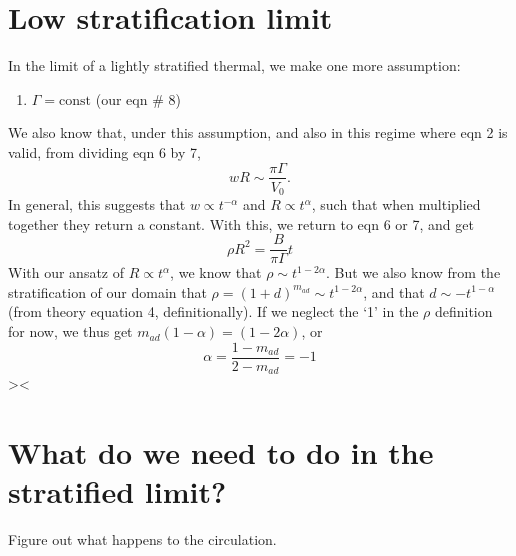 \documentclass[onecolumn, amsmath, amsfonts, amssymb]{aastex62}
\begin{document}
\section{Low stratification limit}
In the limit of a lightly stratified thermal, we make one more assumption:
\begin{enumerate}
\item $\Gamma = \text{const}$ (our eqn \# 8)
\end{enumerate}
We also know that, under this assumption, and also in this regime where eqn 2 is valid,
from dividing eqn 6 by 7, 
$$
w R \sim \frac{\pi\Gamma}{V_0}.
$$
In general, this suggests that $w \propto t^{-\alpha}$ and $R \propto t^{\alpha}$, such that
when multiplied together they return a constant. With this, we return to eqn 6 or 7, and get
\begin{equation}
\rho R^2 = \frac{B}{\pi \Gamma} t
\label{eqn:theory_eqn_6_and_7}
\end{equation}
With our ansatz of $R \propto t^{\alpha}$, we know that $\rho \sim t^{1 - 2\alpha}$.
But we also know from the stratification of our domain that 
$\rho = (1 + d)^{m_{ad}} \sim t^{1 - 2\alpha}$, and that $d \sim -t^{1-\alpha}$ (from
theory equation 4, definitionally). If we neglect the `1' in the $\rho$ definition for now,
we thus get $m_{ad}(1 - \alpha) = (1 - 2\alpha)$, or
$$
\alpha = \frac{1 - m_{ad}}{2 - m_{ad}} = -1
$$
><

\section{What do we need to do in the stratified limit?}
Figure out what happens to the circulation.



\end{document}
